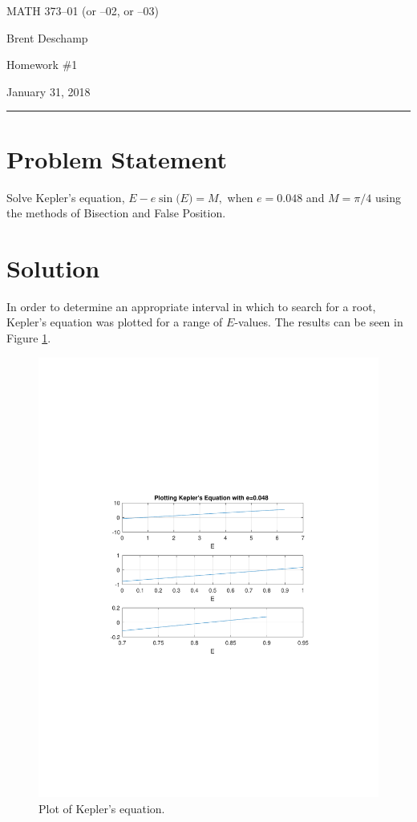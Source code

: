 \documentclass[11pt]{article}
\begin{document}
MATH 373--01 (or --02, or --03)

Brent Deschamp

Homework \#1

January 31, 2018

\medskip\hrule\medskip

\section{Problem Statement}

Solve Kepler's equation, $E - e\sin{(E}) = M,$ when $e=0.048$ and $M = \pi/4$ using the methods of Bisection and False Position.

\section{Solution}

In order to determine an appropriate interval in which to search for a root, Kepler's equation was plotted for a range of $E$-values.  The results can be seen in Figure \ref{fig:kepler}.

\begin{figure}[h]
\begin{center}
\includegraphics[trim={1.5in 3.55in 1.5in 3.25in},clip]{kepler_plot}
\caption{Plot of Kepler's equation.}\label{fig:kepler}
\end{center}
\end{figure}
\end{document}
